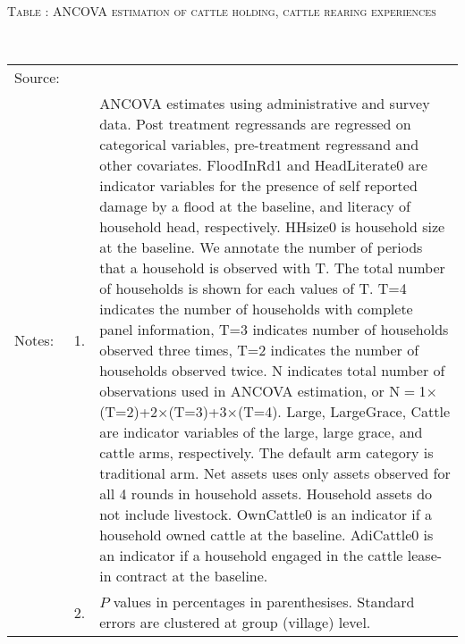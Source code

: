 \hspace{-1cm}\begin{minipage}[t]{14cm}
\hfil\textsc{\normalsize Table \thetable: ANCOVA estimation of cattle holding, cattle rearing experiences\label{tab ANCOVA net assets experience}}\\
\setlength{\tabcolsep}{1pt}
\setlength{\baselineskip}{8pt}
\renewcommand{\arraystretch}{.52}
\hfil{}\\
\renewcommand{\arraystretch}{.8}
\setlength{\tabcolsep}{1pt}
\begin{tabular}{>{\hfill\scriptsize}p{1cm}<{}>{\hfill\scriptsize}p{.25cm}<{}>{\scriptsize}p{12cm}<{\hfill}}
Source:& \multicolumn{2}{l}{\scriptsize Estimated with GUK administrative and survey data.}\\
Notes: & 1. & ANCOVA estimates using administrative and survey data. Post treatment regressands are regressed on categorical variables, pre-treatment regressand and other covariates. \textsf{FloodInRd1} and \textsf{HeadLiterate0} are indicator variables for the presence of self reported damage by a flood at the baseline, and literacy of household head, respectively. \textsf{HHsize0} is household size at the baseline. We annotate the number of periods that a household is observed with \textsf{T}. The total number of households is shown for each values of \textsf{T}. \textsf{T=4} indicates the number of households with complete panel information, \textsf{T=3} indicates number of households observed three times, \textsf{T=2} indicates the number of households observed twice. \textsf{N} indicates total number of observations used in ANCOVA estimation, or \textsf{N$=$1$\times$(T=2)+2$\times$(T=3)+3$\times$(T=4)}.  \textsf{Large}, \textsf{LargeGrace}, \textsf{Cattle} are indicator variables of the \textsf{large}, \textsf{large grace}, and \textsf{cattle} arms, respectively. The default arm category is \textsf{traditional} arm. Net assets uses only assets observed for all 4 rounds in household assets. Household assets do not include livestock. \textsf{OwnCattle0} is an indicator if a household owned cattle at the baseline. \textsf{AdiCattle0} is an indicator if a household engaged in the cattle lease-in contract at the baseline.  \\
& 2. & $P$ values in percentages in parenthesises. Standard errors are clustered at group (village) level.
\end{tabular}
\end{minipage}

